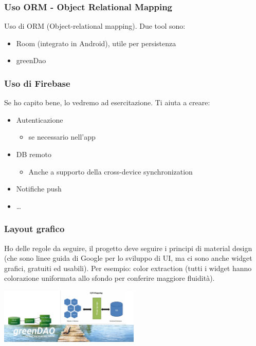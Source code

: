 \subsubsection{Uso ORM - Object Relational Mapping}
\par Uso di ORM (Object-relational mapping). Due tool sono:
\begin{itemize}
    \item Room (integrato in Android), utile per persistenza
    \item greenDao
\end{itemize}

\subsubsection{Uso di Firebase}
\par Se ho capito bene, lo vedremo ad esercitazione. Ti aiuta a creare:
\begin{itemize}
    \item Autenticazione
    \begin{itemize}
        \item se necessario nell'app
    \end{itemize}
    \item DB remoto
    \begin{itemize}
        \item Anche a supporto della cross-device synchronization
    \end{itemize}
    \item Notifiche push
    \item \dots
\end{itemize}

\subsubsection{Layout grafico}
\par Ho delle regole da seguire, il progetto deve seguire i principi di material design (che sono linee guida di Google per lo sviluppo di UI, ma ci sono anche widget grafici, gratuiti ed usabili). Per esempio: color extraction (tutti i widget hanno colorazione uniformata allo sfondo per conferire maggiore fluidità).
\begin{center}
    \includegraphics[width=0.5\textwidth]{images/00_orm1.png}
\end{center}

